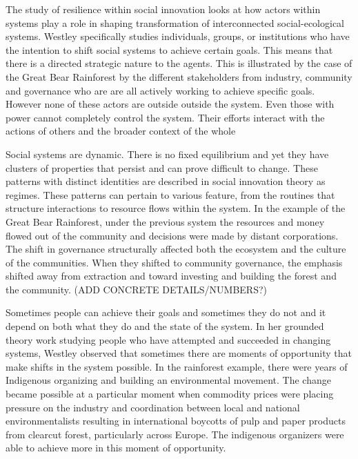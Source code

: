 The study of resilience within social innovation looks at how actors within  systems play a role in shaping transformation of interconnected social-ecological systems. Westley specifically studies individuals, groups, or institutions who have the intention to shift social systems to achieve certain goals. This means that there is a directed strategic nature to the agents. This is illustrated by the case of the Great Bear Rainforest by the different stakeholders from industry, community and governance who are are all actively working to achieve specific goals. However none of these actors are outside outside the system. Even those with power cannot completely control the system. Their efforts interact with the actions of others and the broader context of the whole

Social systems are dynamic. There is no fixed equilibrium and yet they have clusters of properties that persist and can prove difficult to change. These patterns with distinct identities are described in social innovation theory as regimes. These patterns can pertain to various feature, from the routines that structure interactions to resource flows within the system. In the example of the Great Bear Rainforest, under the previous system the resources and money flowed out of the community and decisions were made by distant corporations. The shift in governance structurally affected both the ecosystem and the culture of the communities. When they shifted to community governance, the emphasis shifted away from extraction and toward investing and building the forest and the community. (ADD CONCRETE DETAILS/NUMBERS?) 

Sometimes people can achieve their goals and sometimes they do not and it depend on both what they do and the state of the system. In her grounded theory work studying people who have attempted and succeeded in changing systems, Westley observed that sometimes there are moments of opportunity that make shifts in the system possible.  In the rainforest example, there were years of Indigenous organizing and building an environmental movement. 
The change became possible at a particular moment when commodity prices were placing pressure on the industry and coordination between local and national environmentalists resulting in international boycotts of pulp and paper products from clearcut forest, particularly across Europe. The indigenous organizers were able to achieve more in this moment of opportunity.


